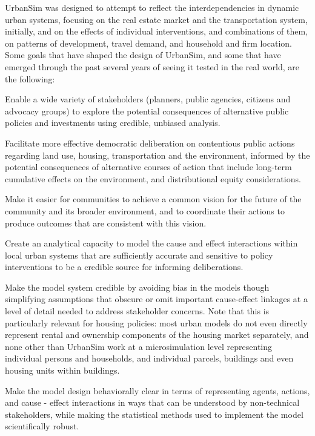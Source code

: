 UrbanSim was designed to attempt to reflect the interdependencies in dynamic urban systems, focusing on the real estate market and the transportation system, initially, and on the effects of individual interventions, and combinations of them, on patterns of development, travel demand, and household and firm location.  Some goals that have shaped the design of UrbanSim, and some that have emerged through the past several years of seeing it tested in the real world, are the following:

\bigskip
\squishlist
\item Enable a wide variety of stakeholders (planners, public agencies, citizens and advocacy groups) to explore the potential consequences of alternative public policies and investments using credible, unbiased analysis.
\item Facilitate more effective democratic deliberation on contentious public actions regarding land use, housing, transportation and the environment, informed by the potential consequences of alternative courses of action that include long-term cumulative effects on the environment, and distributional equity considerations.
\item Make it easier for communities to achieve a common vision for the future of the community and its broader environment, and to coordinate their actions to produce outcomes that are consistent with this vision.
\item Create an analytical capacity to model the cause and effect interactions within local urban systems that are sufficiently accurate and sensitive to policy interventions to be a credible source for informing deliberations.
\item Make the model system credible by avoiding bias in the models though simplifying assumptions that obscure or omit important cause-effect linkages at a level of detail needed to address stakeholder concerns. Note that this is particularly relevant for housing policies: most urban models do not even directly represent rental and ownership components of the housing market separately, and none other than UrbanSim work at a microsimulation level representing individual persons and households, and individual parcels, buildings and even housing units within buildings.
\item Make the model design behaviorally clear in terms of representing agents, actions, and cause - effect interactions in ways that can be understood by non-technical stakeholders, while making the statistical methods used to implement the model scientifically robust.
